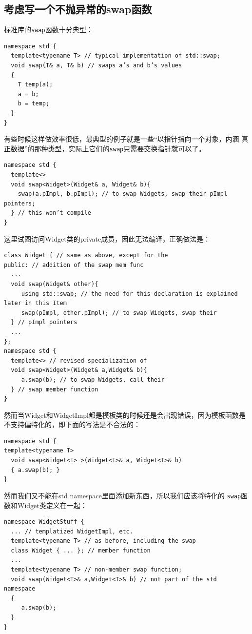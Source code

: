 \subsection{考虑写一个不抛异常的swap函数}
\label{sec:Item-25}

标准库的\texttt{swap}函数十分典型：
\begin{verbatim}
namespace std {
  template<typename T> // typical implementation of std::swap;
  void swap(T& a, T& b) // swaps a’s and b’s values
  {
    T temp(a);
    a = b;
    b = temp;
  }
}
\end{verbatim}

有些时候这样做效率很低，最典型的例子就是一些“以指针指向一个对象，内涵
真正数据”的那种类型，实际上它们的\texttt{swap}只需要交换指针就可以了。

\begin{verbatim}
namespace std {
  template<> 
  void swap<Widget>(Widget& a, Widget& b){
    swap(a.pImpl, b.pImpl); // to swap Widgets, swap their pImpl pointers;
  } // this won’t compile
}
\end{verbatim}
这里试图访问Widget类的private成员，因此无法编译，正确做法是：
\begin{verbatim}
class Widget { // same as above, except for the
public: // addition of the swap mem func
  ...
  void swap(Widget& other){
     using std::swap; // the need for this declaration is explained later in this Item
     swap(pImpl, other.pImpl); // to swap Widgets, swap their
  } // pImpl pointers
  ...
};
namespace std {
  template<> // revised specialization of
  void swap<Widget>(Widget& a,Widget& b){
     a.swap(b); // to swap Widgets, call their
  } // swap member function
}
\end{verbatim}

然而当Widget和WidgetImpl都是模板类的时候还是会出现错误，因为模板函数是
不支持偏特化的，即下面的写法是不合法的：
\begin{verbatim}
namespace std {
template<typename T>
  void swap<Widget<T> >(Widget<T>& a, Widget<T>& b)
  { a.swap(b); }
}
\end{verbatim}
然而我们又不能在std namespace里面添加新东西，所以我们应该将特化的
\texttt{swap}函数和Widget类定义在一起：
\begin{verbatim}
namespace WidgetStuff {
  ... // templatized WidgetImpl, etc.
  template<typename T> // as before, including the swap
  class Widget { ... }; // member function
  ...
  template<typename T> // non-member swap function;
  void swap(Widget<T>& a,Widget<T>& b) // not part of the std namespace
  {
     a.swap(b);
  }
}
\end{verbatim}

